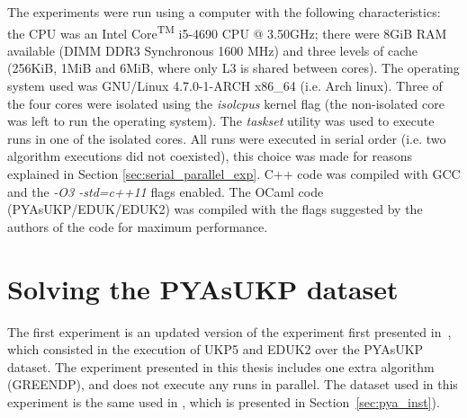 The experiments were run using a computer with the following characteristics: the CPU was an Intel\textsuperscript{\textregistered} Core\textsuperscript{TM} i5-4690 CPU @ 3.50GHz; there were 8GiB RAM available (DIMM DDR3 Synchronous 1600 MHz) and three levels of cache (256KiB, 1MiB and 6MiB, where only L3 is shared between cores).
The operating system used was GNU/Linux 4.7.0-1-ARCH x86\_64 (i.e. Arch linux). 
Three of the four cores were isolated using the \emph{isolcpus} kernel flag (the non-isolated core was left to run the operating system). 
The \emph{taskset} utility was used to execute runs in one of the isolated cores.
All runs were executed in serial order (i.e. two algorithm executions did not coexisted), this choice was made for reasons explained in Section \ref{sec:serial_parallel_exp}.
C++ code was compiled with GCC and the \emph{-O3 -std=c++11} flags enabled.
The OCaml code (PYAsUKP/EDUK/EDUK2) was compiled with the flags suggested by the authors of the code for maximum performance.


\section{Solving the PYAsUKP dataset}
\label{sec:pya_exp}

The first experiment is an updated version of the experiment first presented in~\cite{sea2016}, which consisted in the execution of UKP5 and EDUK2 over the PYAsUKP dataset.
The experiment presented in this thesis includes one extra algorithm (GREENDP), and does not execute any runs in parallel.
The dataset used in this experiment is the same used in \cite{sea2016}, which is presented in Section~\ref{sec:pya_inst}).

